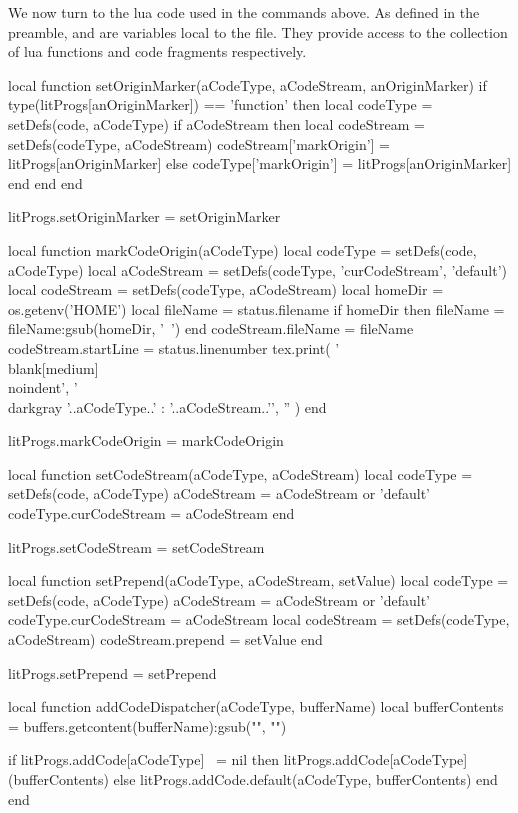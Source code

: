 We now turn to the lua code used in the \type{\directlua} commands above. 
As defined in the preamble,  and  are variables 
local to the  file. They provide access to the 
collection of lua functions and code fragments respectively. 

\startLuaCode
local function setOriginMarker(aCodeType, aCodeStream, anOriginMarker)
  if type(litProgs[anOriginMarker]) == 'function' then
    local codeType  = setDefs(code, aCodeType)
    if aCodeStream then
      local codeStream = setDefs(codeType, aCodeStream)
      codeStream['markOrigin'] = litProgs[anOriginMarker]
    else
      codeType['markOrigin'] = litProgs[anOriginMarker]
    end
  end
end

litProgs.setOriginMarker = setOriginMarker

local function markCodeOrigin(aCodeType)
  local codeType         = setDefs(code, aCodeType)
  local aCodeStream      = setDefs(codeType, 'curCodeStream', 'default')
  local codeStream       = setDefs(codeType, aCodeStream)
  local homeDir          = os.getenv('HOME')
  local fileName         = status.filename
  if homeDir then
    fileName = fileName:gsub(homeDir, '~')
  end
  codeStream.fileName    = fileName
  codeStream.startLine   = status.linenumber
  tex.print({
   '\\blank[medium]\\noindent',
   '{\\darkgray '..aCodeType..' : '..aCodeStream..'}',
   ''
   })
end

litProgs.markCodeOrigin = markCodeOrigin

local function setCodeStream(aCodeType, aCodeStream)
  local codeType         = setDefs(code, aCodeType)
  aCodeStream            = aCodeStream or 'default'
  codeType.curCodeStream = aCodeStream
end

litProgs.setCodeStream = setCodeStream

local function setPrepend(aCodeType, aCodeStream, setValue)
  local codeType         = setDefs(code, aCodeType)
  aCodeStream            = aCodeStream or 'default'
  codeType.curCodeStream = aCodeStream
  local codeStream       = setDefs(codeType, aCodeStream)
  codeStream.prepend     = setValue
end

litProgs.setPrepend = setPrepend

local function addCodeDispatcher(aCodeType, bufferName)
  local bufferContents  =
    buffers.getcontent(bufferName):gsub("", "\n")

  if litProgs.addCode[aCodeType] ~= nil then
    litProgs.addCode[aCodeType](bufferContents)
  else
    litProgs.addCode.default(aCodeType, bufferContents)
  end
end

